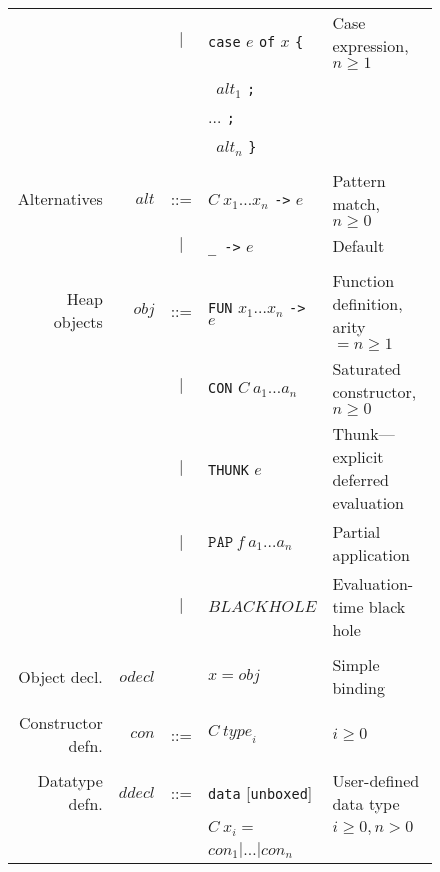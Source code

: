 \documentclass{llncs}
\begin{document}
\begin{figure}
\begin{tabular}{r r c l l}
             &                & $|$ & \texttt{case} $e$ \texttt{of} $x$ \texttt{\{}  & Case expression, $n \ge 1$\\
             &                &     & \texttt{ } $\mathit{alt}_1$ \texttt{;} \\
             &                &     & \hspace{0.2in} $\dots$ \texttt{;} \\
             &                &     & \texttt{ } $\mathit{alt}_n$ \texttt{\}} \\
\\
Alternatives & $\mathit{alt}$ & ::= & $C\ x_1\dots x_n$ \texttt{->} $e$            & Pattern match, $n \ge 0$ \\
             &                & $|$ & \texttt{\_ ->} $e$                           & Default \\
\\
Heap objects & $\mathit{obj}$ & ::= &\texttt{FUN} $x_1\dots x_n$ \texttt{->} $e$   & Function definition, arity $=n\ge 1$ \\
             &                & $|$ &\texttt{CON} $C\ a_1\dots a_n$                & Saturated constructor, $n \ge 0$ \\
             &                & $|$ &\texttt{THUNK} $e$                            & Thunk---explicit deferred evaluation \\
             &                & $|$ & $\texttt{PAP}\ f\ a_1\dots a_n$               & Partial application \\
             &                & $|$ & $\mathit{BLACKHOLE}$                         & Evaluation-time black hole \\
\\
Object decl. & $\mathit{odecl}$ &     & $x = \mathit{obj}$                           & Simple binding \\
\\
Constructor defn. & $\mathit{con}$  & ::= & $C\ \mathit{type}_i$ & $i \ge 0$ \\
\\
Datatype defn. &  $\mathit{ddecl}$ & ::= & \texttt{data} [\texttt{unboxed}] & User-defined data type  \\
               &                   &     & $C\ x_i =$                       & $i \ge 0, n > 0$         \\
               &                   &     & $\mathit{con}_1 | \dots |  \mathit{con}_n$ \\


\end{tabular}
\end{figure}
\end{document}
